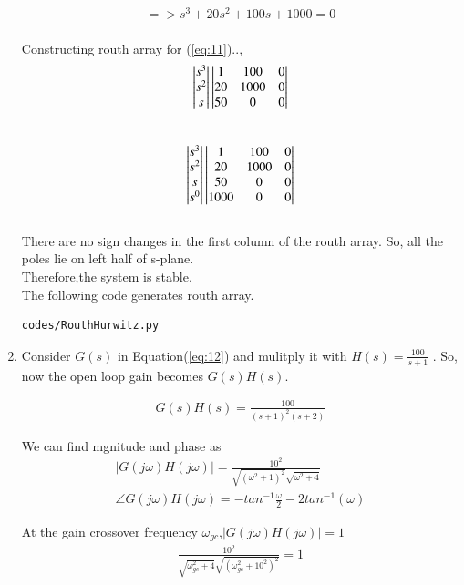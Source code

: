 \begin{enumerate}[label=\thesection.\arabic*.,ref=\thesection.\theenumi]
\begin{align}
=> s^{3}+20s^{2}+100s+1000=0   \label{eq:11} 
\end{align}
\\
Constructing routh array for (\ref{eq:11})..,
\begin{align}
\begin{vmatrix}s^3\\s^2\\s\end{vmatrix}
\begin{vmatrix}1 & 100 & 0 \\ 20 & 1000 & 0 \\ 50 & 0 & 0\end{vmatrix}
\end{align}\\

\begin{align}
\begin{vmatrix}s^3\\s^2\\s\\s^0\end{vmatrix}
\begin{vmatrix}1 & 100 & 0 \\ 20 & 1000 & 0 \\ 50 & 0 & 0 \\ 1000 & 0 & 0\end{vmatrix}
\end{align}\\

There are no sign changes in the first column of the routh array. So, all the poles lie on left half of s-plane. \\
Therefore,the system is stable.\\
The following code generates routh array.
\begin{lstlisting}
codes/RouthHurwitz.py
\end{lstlisting}

\item
Consider $G(s)$ in Equation(\ref{eq:12}) and mulitply it with $H(s)=\frac{100}{s+1}$ . So, now the open loop gain becomes $G(s)H(s)$.

\begin{align}
G(s)H(s)=\frac{100}{(s+1)^{2}(s+2)}
\label{eq:13} 
\end{align}

We can find mgnitude and phase as \\
\begin{align}
|G(j\omega)H(j\omega)|=\frac{10^{2}}{ \sqrt{(\omega^{2}+1)^{2}}
\sqrt{\omega^{2}+4}} \\
\angle G(j\omega)H(j\omega)=-tan^{-1}\frac{\omega}{2}-2tan^{-1}(\omega) \label{eq:14} 
\end{align}

At the gain crossover frequency $\omega_{gc}$,$|G(j\omega)H(j\omega)|=1$
\\
\begin{align}
\frac{10^{2}}{\sqrt{\omega_{gc}^{2}+4} \sqrt{(\omega_{gc}^{2}+10^{2})^{2}}}=1 \\
\end{align}


\end{enumerate}
